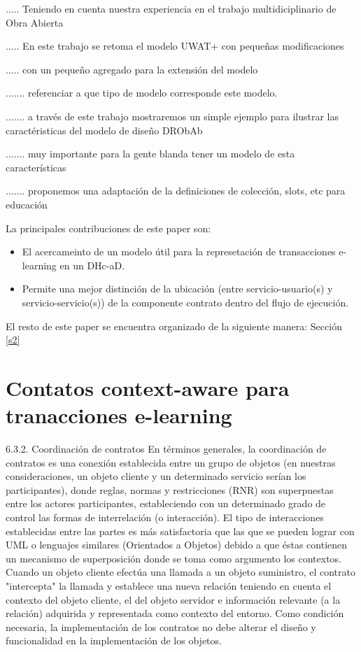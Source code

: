\documentclass{llncs}
\begin{document}
..... Teniendo en cuenta nuestra experiencia en el trabajo multidiciplinario de Obra Abierta

..... En este trabajo se retoma el modelo UWAT+ con pequeñas modificaciones 

..... con un pequeño agregado para la extensión del modelo 

....... referenciar a que tipo de modelo corresponde este modelo.

.......  a través de este trabajo mostraremos un simple ejemplo para ilustrar las caractéristicas del modelo de diseño DRObAb 

.......  muy importante para la gente blanda tener un modelo de esta características

....... proponemos una adaptación de la definiciones de colección, slots, etc para educación 


La principales contribuciones de este paper son:

\begin{itemize}
 \item El acercameinto de un modelo útil para la represetación de transacciones e-learning en un DHc-aD. 
 \item Permite una mejor distinción de la ubicación (entre servicio-usuario(s) y servicio-servicio(s)) de la componente contrato dentro del flujo de ejecución.

\end{itemize}

El resto de este paper se encuentra organizado de la siguiente manera: Sección \ref{s2}



\section{Contatos context-aware para tranacciones e-learning}


6.3.2. Coordinación de contratos
En términos generales, la coordinación de contratos es una conexión establecida entre un grupo de objetos (en nuestras consideraciones, un objeto cliente y un determinado servicio serían los participantes), donde reglas, normas y restricciones (RNR) son superpuestas entre los actores participantes, estableciendo con un determinado grado de control las formas de interrelación (o interacción). 
El tipo de interacciones establecidas entre las partes es más satisfactoria que las que se pueden lograr con UML o lenguajes similares (Orientados a Objetos) debido a que éstas contienen un mecanismo de superposición donde se toma como argumento los contextos. Cuando un objeto cliente efectúa una llamada a un objeto suministro, el contrato "intercepta" la llamada y establece una nueva relación teniendo en cuenta el contexto del objeto cliente, el del objeto servidor e información relevante (a la relación) adquirida y representada como contexto del entorno. Como condición necesaria, la implementación de los contratos no debe alterar el diseño y funcionalidad en la implementación de los objetos.
\end{document}
